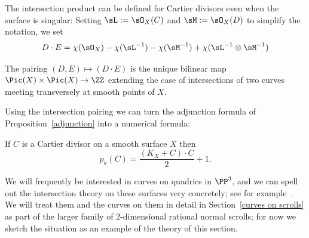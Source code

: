 The intersection product can be defined for Cartier divisors even when the surface is singular: Setting $\sL := \sO_X(C)$ and
$\sM := \sO_X(D)$ to simplify the notation, we set 
$$
D\cdot E = \chi(\sO_X)-\chi(\sL^{-1}) -\chi(\sM^{-1}) +\chi(\sL^{-1}\otimes \sM^{-1}) 
$$
\begin{theorem} The pairing $(D,E) \mapsto (D\cdot E)$ is the unique bilinear map
$\Pic(X) \times \Pic(X) \to \ZZ$ extending the case of intersections of two curves meeting transversely at smooth points of $X$. 
\end{theorem}

Using the intersection pairing we can turn the adjunction formula of Proposition~\ref{adjunction} into a numerical formula:

\begin{theorem}\label{adjunction formula} 
If $C$ is a Cartier divisor on a smooth surface $X$ then\label{genus formula}
$$
p_a(C) = \frac{(K_X+C)\cdot C}{2} +1.
 $$
\end{theorem}

We will frequently be interested in curves on quadrics in $\PP^3$, and we can spell out the
intersection theory on these surfaces very concretely; see for example~\cite[Section V.1]{H}.
We will treat them and the curves on them in detail in Section~\ref{curves on scrolls} as part of the larger family of 2-dimensional rational normal scrolls; for
now we sketch the situation as an example of the theory of this section. 

